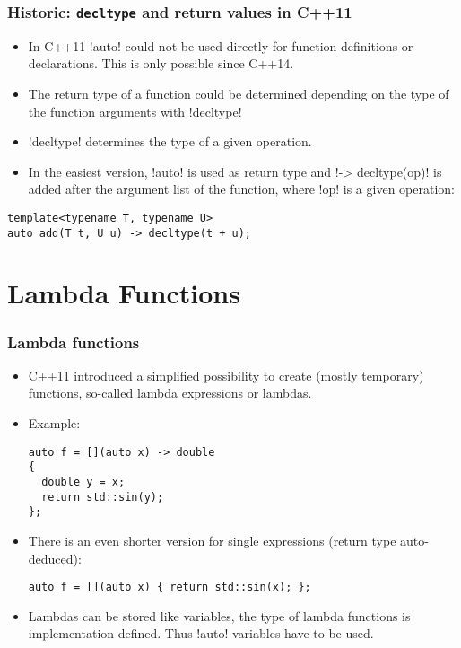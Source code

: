 \begin{frame}[fragile]
\frametitle{Historic: \lstinline!decltype! and return values in C++11}
\begin{itemize}
\item In C++11 \inline!auto! could not be used directly for function definitions or declarations. This is only possible since C++14.
\item The return type of a function could be determined depending on the type of the function arguments with \inline!decltype!
\item \inline!decltype! determines the type of a given operation.
\item In the easiest version, \inline!auto! is used as return type and \inline!-> decltype(op)! is added after the argument list of the function, where \inline!op! is a given operation:
\end{itemize}
\begin{lstlisting}
template<typename T, typename U>
auto add(T t, U u) -> decltype(t + u);
\end{lstlisting}

\end{frame}


\section{Lambda Functions}

\begin{frame}[fragile]
  \frametitle<presentation>{Lambda functions}
  \begin{itemize}
  \item C++11 introduced a simplified possibility to create (mostly temporary) functions, so-called lambda expressions or lambdas.
  \item Example:
\begin{lstlisting}
auto f = [](auto x) -> double 
{
  double y = x;
  return std::sin(y);
};
\end{lstlisting}
\item There is an even shorter version for single expressions (return type auto-deduced):
\begin{lstlisting}
auto f = [](auto x) { return std::sin(x); };
\end{lstlisting}
\item Lambdas can be stored like variables, the type of lambda functions is implementation-defined. Thus \inline!auto! variables have to be used.
  \end{itemize}
\end{frame}


